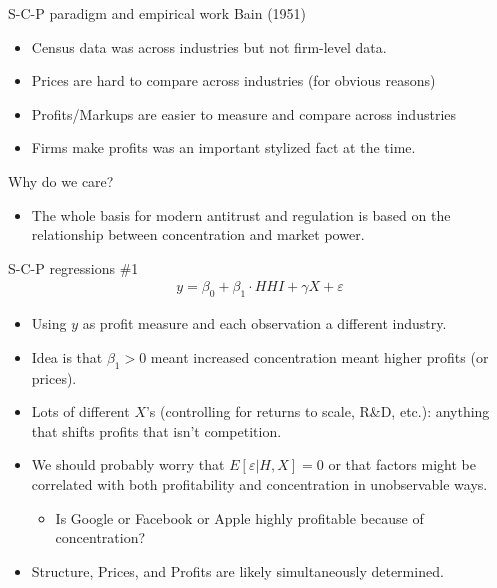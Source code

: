 \begin{frame}{S-C-P paradigm and empirical work}
Bain (1951)
\begin{itemize}
\item Census data was across industries but not firm-level data.
\item Prices are hard to compare across industries (for obvious reasons)
\item Profits/Markups are easier to measure and compare across industries
\item Firms make profits was an important stylized fact at the time.
\end{itemize}
Why do we care?
\begin{itemize}
\item The whole basis for modern antitrust and regulation is based on the relationship between concentration and market power.
\end{itemize}
\end{frame}

\begin{frame}{S-C-P regressions \#1}
\begin{eqnarray*}
y = \beta_0 + \beta_1 \cdot HHI + \gamma X +  \varepsilon
\end{eqnarray*}

\begin{itemize}
\item Using $y$ as profit measure and each observation a different industry.
\item Idea is that $\beta_1 > 0$ meant increased concentration meant higher profits (or prices).
\item Lots of different $X$'s (controlling for returns to scale, R\&D, etc.): anything that shifts profits that isn't competition.
\item We should probably worry that $E[\varepsilon | H, X ] = 0$ or that factors might be correlated with both profitability and concentration in unobservable ways.
\begin{itemize}
\item Is Google or Facebook or Apple highly profitable because of concentration?
\end{itemize}
\item Structure, Prices, and Profits are likely simultaneously determined.
\end{itemize}
\end{frame}

